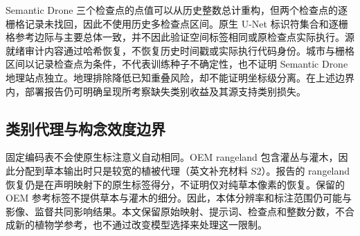 Semantic Drone 三个检查点的点值可以从历史整数总计重构，但两个检查点的逐栅格记录未找回，因此不使用历史多检查点区间。原生 U-Net 标识符集合和逐栅格参考边际与主要总体一致，并不因此验证空间标签相同或原检查点实际执行。源就绪审计内容通过哈希恢复，不恢复历史时间戳或实际执行代码身份。城市与栅格区间以记录检查点为条件，不代表训练种子不确定性，也不证明 Semantic Drone 地理站点独立。地理排除降低已知重叠风险，却不能证明坐标级分离。在上述边界内，部署报告仍可明确呈现所考察缺失类别收益及其源支持类别损失。

\subsection{类别代理与构念效度边界}
固定编码表不会使原生标注意义自动相同。OEM rangeland 包含灌丛与灌木，因此分配到草本输出时只是较宽的植被代理（英文补充材料 S2）。报告的 rangeland 恢复仍是在声明映射下的原生标签得分，不证明仅对纯草本像素的恢复。保留的 OEM 参考标签不提供草本与灌木的细分。因此，本体分辨率和标注范围仍可能与影像、监督共同影响结果。本文保留原始映射、提示词、检查点和整数分数，不合成新的植物学参考，也不通过改变模型选择来处理这一限制。
